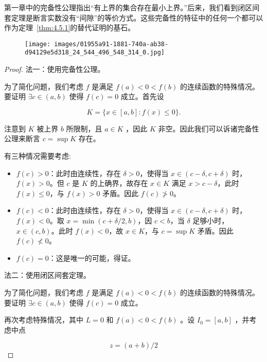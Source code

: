 第一章中的完备性公理指出“有上界的集合存在最小上界。”后来，我们看到闭区间套定理是断言实数没有“间隙”的等价方式。这些完备性的特征中的任何一个都可以作为定理~\ref{thm:4.5.1}的替代证明的基石。


\begin{figure}[h]
  \centering
  \texttt{[image: images/01955a91-1881-740a-ab38-d94129e5d318\_24\_544\_496\_548\_314\_0.jpg]}
\end{figure}

\begin{proof}
  法一：使用完备性公理。

  为了简化问题，我们考虑 \(f\) 是满足 \(f\left( a\right)  < 0 < f\left( b\right)\) 的连续函数的特殊情况。要证明 \(\exists c \in  \left( {a,b}\right)\)  使得  \(f\left( c\right)  = 0\) 成立。首先设

\[
K = \{ x \in  \left\lbrack  {a,b}\right\rbrack   : f\left( x\right)  \leq  0\} .
\]

注意到 \(K\) 被上界 $b$ 所限制，且 \(a \in  K\) ，因此 \(K\) 非空。因此我们可以诉诸完备性公理来断言 \(c = \sup K\) 存在。

有三种情况需要考虑:

\begin{itemize}
\item $f(c)>0$：此时由连续性，存在 $ \delta > 0 $，使得当 $ x \in (c - \delta, c + \delta) $ 时，$ f(x) > 0 $。但 $ c $ 是 $ K $ 的上确界，故存在 $ x \in K $ 满足 $ x > c - \delta $，此时 $ f(x) \leq 0 $，与 $ f(x) > 0 $ 矛盾。因此 $ f(c) \not> 0 $。
\item $f(c)<0$：此时由连续性，存在 $ \delta > 0 $，使得当 $ x \in (c - \delta, c + \delta) $ 时，$ f(x) < 0 $。取 $ x = \min(c + \delta/2, b) $，因 $ c < b $，当 $ \delta $ 足够小时，$ x \in (c, b) $。此时 $ f(x) < 0 $，故 $ x \in K $，与 $ c = \sup K $ 矛盾。因此 $ f(c) \not< 0 $。
\item $f(c) = 0$：这是唯一的可能，得证。
\end{itemize}
 

法二：使用闭区间套定理。

为了简化问题，我们考虑 \(f\) 是满足 \(f\left( a\right)  < 0 < f\left( b\right)\) 的连续函数的特殊情况。要证明 \(\exists c \in  \left( {a,b}\right)\)  使得  \(f\left( c\right)  = 0\) 成立。

再次考虑特殊情况，其中 \(L = 0\) 和 \(f\left( a\right)  < 0 < f\left( b\right)\) 。设 \({I}_{0} = \left\lbrack  {a,b}\right\rbrack\) ，并考虑中点

\[
z = \left( {a + b}\right) /2
\]


\end{proof}
